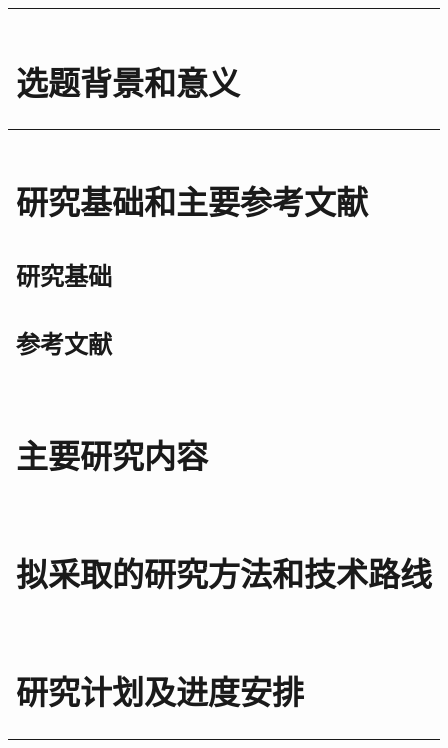 \documentclass[openReport]{XaufeThesisTemplate}
\begin{document}




\begin{longtable}{|p{\textwidth}|}
  \hline
  \endfoot
  \hline
  \endhead
  \section{选题背景和意义}
  \\ \hline
  \section{研究基础和主要参考文献}
    \subsection{研究基础}
    \subsection{参考文献}
      
      \nocite{*}
  \\ \hline
  \section{主要研究内容}

  \\ \hline
  \section{拟采取的研究方法和技术路线}
  \\ \hline
  \section{研究计划及进度安排}
  \\ \hline
  
\end{longtable}
\vspace{-0.5cm}
\begin{tablenotes}
  \item {}
\end{tablenotes}
\end{document}
